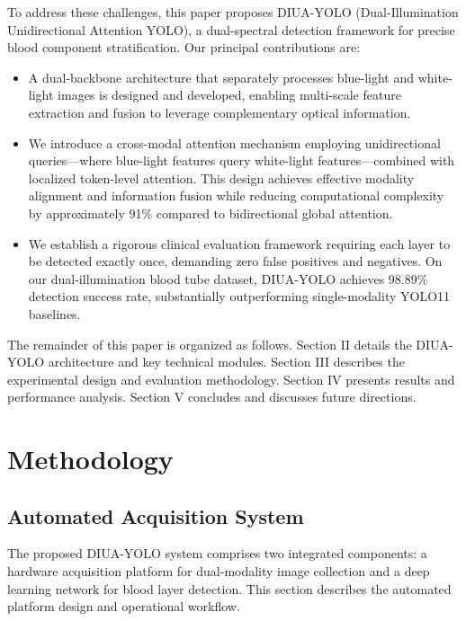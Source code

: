 \documentclass[journal,twoside,web]{ieeecolor}
\begin{document}
To address these challenges, this paper proposes DIUA-YOLO (Dual-Illumination Unidirectional Attention YOLO), a dual-spectral detection framework for precise blood component stratification. Our principal contributions are:

\begin{itemize}
    \item A dual-backbone architecture that separately processes blue-light and white-light images is designed and developed, enabling multi-scale feature extraction and fusion to leverage complementary optical information. 
    \item We introduce a cross-modal attention mechanism employing unidirectional queries—where blue-light features query white-light features—combined with localized token-level attention. This design achieves effective modality alignment and information fusion while reducing computational complexity by approximately 91\% compared to bidirectional global attention. 
    \item We establish a rigorous clinical evaluation framework requiring each layer to be detected exactly once, demanding zero false positives and negatives. On our dual-illumination blood tube dataset, DIUA-YOLO achieves 98.89\% detection success rate, substantially outperforming single-modality YOLO11 baselines. 
\end{itemize}

The remainder of this paper is organized as follows. Section II details the DIUA-YOLO architecture and key technical modules. Section III describes the experimental design and evaluation methodology. Section IV presents results and performance analysis. Section V concludes and discusses future directions.


\section{Methodology}
\label{sec:methodology}

\subsection{Automated Acquisition System}

The proposed DIUA-YOLO system comprises two integrated components: a hardware acquisition platform for dual-modality image collection and a deep learning network for blood layer detection. This section describes the automated platform design and operational workflow.
\end{document}
